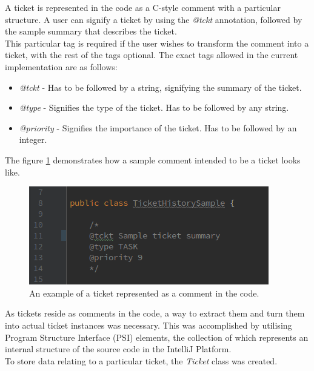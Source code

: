 \documentclass{4thYearProject}
\begin{document}
A ticket is represented in the code as a C-style comment with a particular structure. A user can signify a ticket by using the \textit{@tckt} annotation, followed by the sample summary that describes the ticket. \\
This particular tag is required if the user wishes to transform the comment into a ticket, with the rest of the tags optional. The exact tags allowed in the current implementation are as follows:

\begin{itemize}
\item \textit{@tckt} - Has to be followed by a string, signifying the summary of the ticket.  
\item \textit{@type} - Signifies the type of the ticket. Has to be followed by any string.
\item \textit{@priority} - Signifies the importance of the ticket. Has to be followed by an integer.
\end{itemize}

The figure \ref{fig:ticketcomment} demonstrates  how a sample comment intended to be a ticket looks like.

\begin{figure}[H]
\includegraphics[scale=0.6]{Ticket_comment}
\centering
\caption{An example of a ticket represented as a comment in the code.}\label{ticketcomment}
\label{fig:ticketcomment}
\end{figure}

As tickets reside as comments in the code, a way to extract them and turn them into actual ticket instances was necessary. This was accomplished by utilising Program Structure Interface (PSI) elements, the collection of which represents an internal structure of the source code in the IntelliJ Platform. \\

To store data relating to a particular ticket, the \textit{Ticket} class was created.
\end{document}
